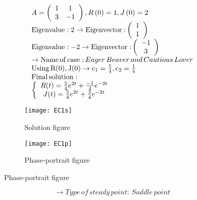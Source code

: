 \documentclass[a4paper]{article}
\begin{document}
\[\begin{array}{l}
A = \left( {\begin{array}{*{20}{c}}
1&1\\
3&{ - 1}
\end{array}} \right),R\left( 0 \right) = 1,J\left( 0 \right) = 2\\
{\rm{Eigenvalue:2}} \to {\rm{Eigenvector:}}\left( {\begin{array}{*{20}{c}}
1\\
1
\end{array}} \right)\\
{\rm{Eigenvalue: - 2}} \to {\rm{Eigenvector:}}\left( {\begin{array}{*{20}{c}}
{ - 1}\\
3
\end{array}} \right)\\
 \to {\rm{Name}}\,{\rm{of}}\,{\rm{case:}}\,Eager\,Beaver\,and\,Cautious\,Lover\\
{\rm{Using}}\,{\rm{R(0), J(0)}} \to {{\rm{c}}_1} = \frac{5}{4},{\rm{ }}{{\rm{c}}_2} = \frac{1}{4}\\
{\rm{Final}}\,{\rm{solution:}}\\
\left\{ {\begin{array}{*{20}{c}}
{R(t) = \frac{5}{4}{e^{2t}} + \frac{{ - 1}}{4}{e^{ - 2t}}}\\
{J(t) = \frac{5}{4}{e^{2t}} + \frac{3}{4}{e^{ - 2t}}}
\end{array}} \right.
\end{array}\]
\begin{figure}[H]
\centering
\begin{subfigure}{.5\textwidth}
  \centering
  \texttt{[image: EC1s]}
  \caption*{Solution figure}
\end{subfigure}%
\begin{subfigure}{.5\textwidth}
  \centering
  \texttt{[image: EC1p]}
  \caption*{Phase-portrait figure}
\end{subfigure}
\end{figure}
\[  \to  Type\,of\,steady\,point:\,Saddle\,point\]
\end{document}
